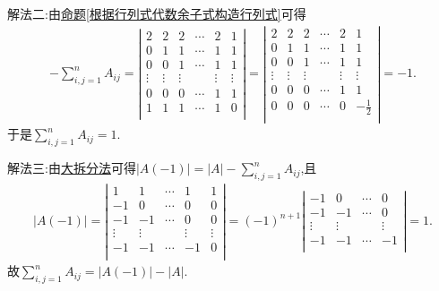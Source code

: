 \documentclass[lang=cn,newtx,10pt,scheme=chinese]{elegantbook}
\begin{document}
\begin{solution}
    {\color{blue}解法二:}由\hyperref[根据行列式代数余子式构造行列式]{命题\ref{根据行列式代数余子式构造行列式}}可得
    \begin{align*}
        -\sum_{i,j=1}^n{A_{ij}}=\left| \begin{matrix}
            2&		2&		2&		\cdots&		2&		1\\
            0&		1&		1&		\cdots&		1&		1\\
            0&		0&		1&		\cdots&		1&		1\\
            \vdots&		\vdots&		\vdots&		&		\vdots&		\vdots\\
            0&		0&		0&		\cdots&		1&		1\\
            1&		1&		1&		\cdots&		1&		0\\
        \end{matrix} \right|=\left| \begin{matrix}
            2&		2&		2&		\cdots&		2&		1\\
            0&		1&		1&		\cdots&		1&		1\\
            0&		0&		1&		\cdots&		1&		1\\
            \vdots&		\vdots&		\vdots&		&		\vdots&		\vdots\\
            0&		0&		0&		\cdots&		1&		1\\
            0&		0&		0&		\cdots&		0&		-\frac{1}{2}\\
        \end{matrix} \right|=-1.
    \end{align*}
    于是$\sum_{i,j=1}^n{A_{ij}}=1$.

    {\color{blue}解法三:}由\hyperref[大拆分法]{大拆分法}可得$\left| A\left( -1 \right) \right|=\left| A \right|-\sum_{i,j=1}^n{A_{ij}}$,且
    \begin{align*}
        \left| A\left( -1 \right) \right|=\left| \begin{matrix}
            1&		1&		\cdots&		1&		1\\
            -1&		0&		\cdots&		0&		0\\
            -1&		-1&		\cdots&		0&		0\\
            \vdots&		\vdots&		&		\vdots&		\vdots\\
            -1&		-1&		\cdots&		-1&		0\\
        \end{matrix} \right|=\left( -1 \right) ^{n+1}\left| \begin{matrix}
            -1&		0&		\cdots&		0\\
            -1&		-1&		\cdots&		0\\
            \vdots&		\vdots&		&		\vdots\\
            -1&		-1&		\cdots&		-1\\
        \end{matrix} \right|=1.
    \end{align*}
故$\sum_{i,j=1}^n{A_{ij}}=\left| A\left( -1 \right) \right|-\left| A \right|$.


\end{solution}
\end{document}

